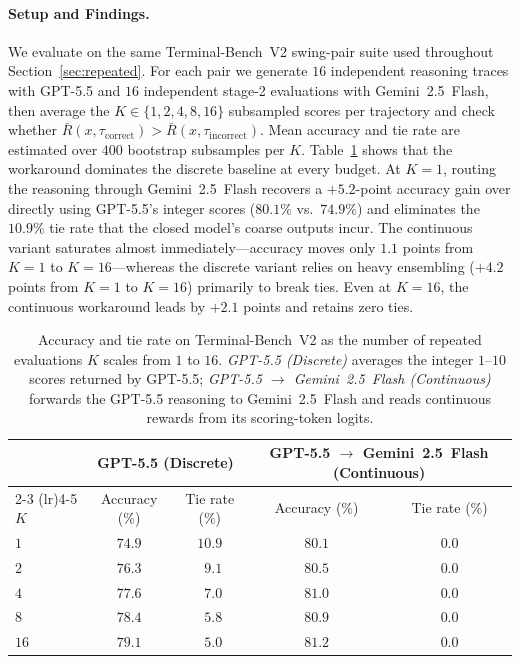 \paragraph{Setup and Findings.} We evaluate on the same Terminal-Bench~V2 swing-pair suite used throughout Section~\ref{sec:repeated}. For each pair we generate $16$ independent reasoning traces with GPT-5.5 and $16$ independent stage-2 evaluations with Gemini~2.5~Flash, then average the $K\!\in\!\{1,2,4,8,16\}$ subsampled scores per trajectory and check whether $\bar R(x,\tau_{\text{correct}}) > \bar R(x,\tau_{\text{incorrect}})$. Mean accuracy and tie rate are estimated over $400$ bootstrap subsamples per $K$. Table~\ref{tab:closed-api} shows that the workaround dominates the discrete baseline at every budget. At $K{=}1$, routing the reasoning through Gemini~2.5~Flash recovers a $+5.2$-point accuracy gain over directly using GPT-5.5's integer scores ($80.1\%$ vs.\ $74.9\%$) and eliminates the $10.9\%$ tie rate that the closed model's coarse outputs incur. The continuous variant saturates almost immediately---accuracy moves only $1.1$ points from $K{=}1$ to $K{=}16$---whereas the discrete variant relies on heavy ensembling ($+4.2$ points from $K{=}1$ to $K{=}16$) primarily to break ties. Even at $K{=}16$, the continuous workaround leads by $+2.1$ points and retains zero ties.

\begin{table}[h]
    \centering
    \caption{ Accuracy and tie rate on Terminal-Bench~V2 as the number of repeated evaluations $K$ scales from $1$ to $16$. \textit{GPT-5.5 (Discrete)} averages the integer $1$--$10$ scores returned by GPT-5.5; \textit{GPT-5.5 $\rightarrow$ Gemini~2.5~Flash (Continuous)} forwards the GPT-5.5 reasoning to Gemini~2.5~Flash and reads continuous rewards from its scoring-token logits.}
    \label{tab:closed-api}
    \small
    \begin{tabular}{lcccc}
    \toprule
    & \multicolumn{2}{c}{GPT-5.5 (Discrete)} & \multicolumn{2}{c}{GPT-5.5 $\rightarrow$ Gemini~2.5~Flash (Continuous)} \\
    \cmidrule(lr){2-3} \cmidrule(lr){4-5}
    $K$ & Accuracy (\%) & Tie rate (\%) & Accuracy (\%) & Tie rate (\%) \\
    \midrule
    $1$  & $74.9$ & $10.9$ & $\mathbf{80.1}$ & $\mathbf{0.0}$ \\
    $2$  & $76.3$ & $\phantom{0}9.1$ & $\mathbf{80.5}$ & $\mathbf{0.0}$ \\
    $4$  & $77.6$ & $\phantom{0}7.0$ & $\mathbf{81.0}$ & $\mathbf{0.0}$ \\
    $8$  & $78.4$ & $\phantom{0}5.8$ & $\mathbf{80.9}$ & $\mathbf{0.0}$ \\
    $16$ & $79.1$ & $\phantom{0}5.0$ & $\mathbf{81.2}$ & $\mathbf{0.0}$ \\
    \bottomrule
    \end{tabular}
\end{table}
